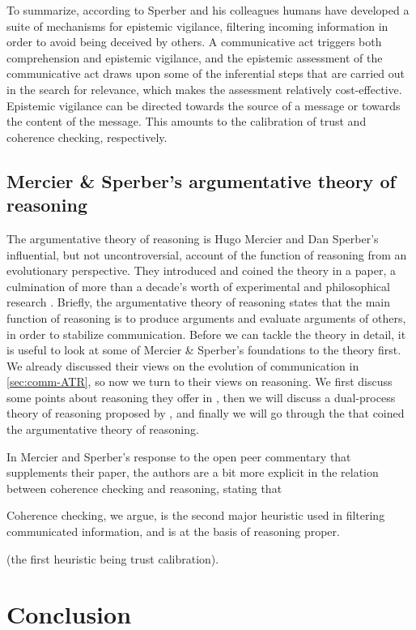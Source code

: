 To summarize, according to Sperber and his colleagues humans have developed a suite of mechanisms for epistemic vigilance, filtering incoming information in order to avoid being deceived by others. A communicative act triggers both comprehension and epistemic vigilance, and the epistemic assessment of the communicative act draws upon some of the inferential steps that are carried out in the search for relevance, which makes the assessment relatively cost-effective. Epistemic vigilance can be directed towards the source of a message or towards the content of the message. This amounts to the calibration of trust and coherence checking, respectively.

\subsection{Mercier \& Sperber's argumentative theory of reasoning}
\label{sec:MS11}

The argumentative theory of reasoning is Hugo Mercier and Dan Sperber's influential, but not uncontroversial, account of the function of reasoning from an evolutionary perspective. They introduced and coined the theory in a \citeyear{MS11} paper, a culmination of more than a decade's worth of experimental and philosophical research \citep{Sperber01, Sperber10, MS09, Sperber00}.
Briefly, the argumentative theory of reasoning states that the main function of reasoning is to produce arguments and evaluate arguments of others, in order to stabilize communication.
Before we can tackle the theory in detail, it is useful to look at some of Mercier \& Sperber's foundations to the theory first. We already discussed their views on the evolution of communication in \cref{sec:comm-ATR}, so now we turn to their views on reasoning. We first discuss some points about reasoning they offer in \citet{Sperber01,Sperber10}, then we will discuss a dual-process theory of reasoning proposed by \citet{MS09}, and finally we will go through the \citeyear{MS11} that coined the argumentative theory of reasoning.

In Mercier and Sperber's response to the open peer commentary that supplements their paper, the authors are a bit more explicit in the relation between coherence checking and reasoning, stating that
\begin{quoting}
    Coherence checking, we argue, is the second major heuristic used in filtering communicated information, and is at the basis of reasoning proper.
    \hfill \citep[p.~96]{MS11}
\end{quoting}
(the first heuristic being trust calibration).

\section{Conclusion}

